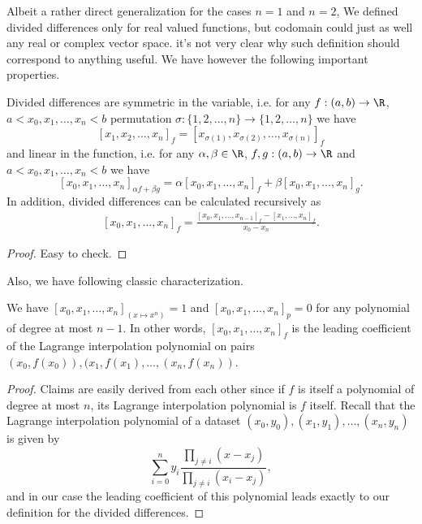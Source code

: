 Albeit a rather direct generalization for the cases $n = 1$ and $n = 2$, We defined divided differences only for real valued functions, but codomain could just as well any real or complex vector space. it's not very clear why such definition should correspond to anything useful. We have however the following important properties.

\begin{prop}
	Divided differences are symmetric in the variable, i.e. for any $f : (a, b) \to \R$, $a < x_{0}, x_{1}, \ldots, x_{n} < b$ permutation $\sigma : \{1, 2, \ldots, n\} \to \{1, 2, \ldots, n\}$ we have
	\[
		[x_{1}, x_{2}, \ldots, x_{n}]_{f} = [x_{\sigma(1)}, x_{\sigma(2)}, \ldots, x_{\sigma(n)}]_{f}
	\]
	and linear in the function, i.e. for any $\alpha, \beta \in \R$, $f, g : (a, b) \to \R$ and $a < x_{0}, x_{1}, \ldots, x_{n} < b$ we have
	\[
		[x_{0}, x_{1}, \ldots, x_{n}]_{\alpha f + \beta g} = \alpha [x_{0}, x_{1}, \ldots, x_{n}]_{f} + \beta [x_{0}, x_{1}, \ldots, x_{n}]_{g}.
	\]
	In addition, divided differences can be calculated recursively as
	\begin{align}\label{divdif_rec}
		[x_{0}, x_{1}, \ldots, x_{n}]_{f} = \frac{[x_{0}, x_{1}, \ldots, x_{n - 1}]_{f} - [x_{1}, \ldots, x_{n}]_{f}}{x_{0} - x_{n}}.
	\end{align}
\end{prop}
\begin{proof}
	Easy to check.
\end{proof}

Also, we have following classic characterization.

\begin{prop}
We have $[x_{0}, x_{1}, \ldots, x_{n}]_{(x \mapsto x^{n})} = 1$ and $[x_{0}, x_{1}, \ldots, x_{n}]_{p} = 0$ for any polynomial of degree at most $n - 1$. In other words, $[x_{0}, x_{1}, \ldots, x_{n}]_{f}$ is the leading coefficient of the Lagrange interpolation polynomial on pairs $(x_{0}, f(x_{0})), (x_{1}, f(x_{1}), \ldots, (x_{n}, f(x_{n}))$.
\end{prop}
\begin{proof}
	Claims are easily derived from each other since if $f$ is itself a polynomial of degree at most $n$, its Lagrange interpolation polynomial is $f$ itself. Recall that the Lagrange interpolation polynomial of a dataset $(x_{0}, y_{0}), (x_{1}, y_{1}), \ldots, (x_{n}, y_{n})$ is given by
	\[
		\sum_{i = 0}^{n} y_{i} \frac{\prod_{j \neq i}(x - x_{j})}{\prod_{j \neq i}(x_{i} - x_{j})},
	\]
	and in our case the leading coefficient of this polynomial leads exactly to our definition for the divided differences.
\end{proof}

